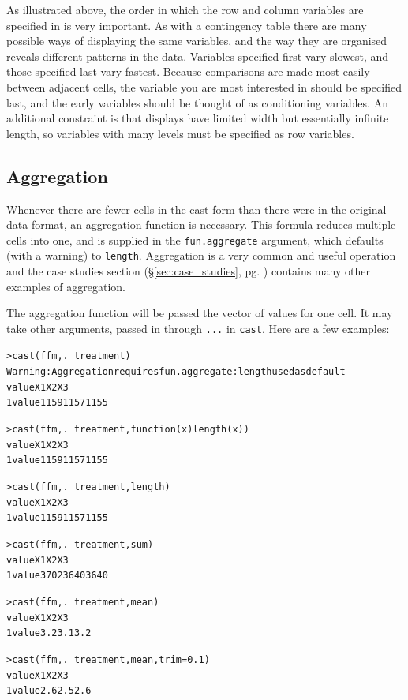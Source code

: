 \documentclass[oneside,letterpaper]{scrartcl}
\newcommand{\secref}[1]{\S \ref{#1}, pg. \pageref{#1}}
\begin{document}
As illustrated above, the order in which the row and column variables are specified in is very important.  As with a contingency table there are many possible ways of displaying the same variables, and the way they are organised reveals different patterns in the data.  Variables specified first vary slowest, and those specified last vary fastest.  Because comparisons are made most easily between adjacent cells, the variable you are most interested in should be specified last, and the early variables should be thought of as conditioning variables.  An additional constraint is that displays have limited width but essentially infinite length, so variables with many levels must be specified as row variables.  

\subsection{Aggregation}\label{sub:aggregation}

Whenever there are fewer cells in the cast form than there were in the original data format, an aggregation function is necessary.  This formula reduces multiple cells into one, and is supplied in the {\tt fun.aggregate} argument, which defaults (with a warning) to {\tt length}.  Aggregation is a very common and useful operation and the case studies section (\secref{sec:case_studies}) contains many other examples of aggregation.  

The aggregation function will be passed the vector of values for one cell.  It may take other arguments, passed in through {\tt ...} in {\tt cast}.  Here are a few examples:

\begin{alltt}
> cast(ffm, . ~ treatment)
Warning:  Aggregation requires fun.aggregate: length used as default 
  value   X1   X2   X3
1 value 1159 1157 1155

> cast(ffm, . ~ treatment, function(x) length(x))
  value   X1   X2   X3
1 value 1159 1157 1155

> cast(ffm, . ~ treatment, length)
  value   X1   X2   X3
1 value 1159 1157 1155

> cast(ffm, . ~ treatment, sum)
  value   X1   X2   X3
1 value 3702 3640 3640

> cast(ffm, . ~ treatment, mean)
  value  X1  X2  X3
1 value 3.2 3.1 3.2

> cast(ffm, . ~ treatment, mean, trim = 0.1)
  value  X1  X2  X3
1 value 2.6 2.5 2.6

\end{alltt}
\end{document}
